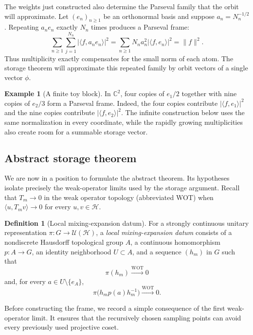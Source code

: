 \documentclass[reqno]{amsart}
\numberwithin{equation}{section}
\theoremstyle{definition}
\newtheorem{definition}[theorem]{Definition}
\newtheorem{example}[theorem]{Example}
\theoremstyle{remark}
\newcommand{\cH}{\mathcal H}
\newcommand{\U}{\mathcal U}
\begin{document}
The weights just constructed also determine the Parseval family that the
orbit will approximate.  Let $(e_n)_{n\geq1}$ be an orthonormal basis and suppose
$a_n=N_n^{-1/2}$.  Repeating $a_ne_n$ exactly $N_n$ times produces a
Parseval frame:
\begin{equation}\label{eq:model-parseval-calculation}
 \sum_{n\geq1}\sum_{j=1}^{N_n}
 |\langle f,a_ne_n\rangle|^2
 =\sum_{n\geq1}N_na_n^2|\langle f,e_n\rangle|^2
 =\|f\|^2.
\end{equation}
Thus multiplicity exactly compensates for the small norm of each atom.  The
storage theorem will approximate this repeated family by orbit vectors of a
single vector $\phi$.

\begin{example}[A finite toy block]\label{ex:finite-parseval-block}
In $\mathbb C^2$, four copies of $e_1/2$ together with nine copies of
$e_2/3$ form a Parseval frame.  Indeed, the four copies contribute
$|\langle f,e_1\rangle|^2$ and the nine copies contribute
$|\langle f,e_2\rangle|^2$.  The infinite construction below uses the same
normalization in every coordinate, while the rapidly growing multiplicities
also create room for a summable storage vector.
\end{example}

\subsection{Abstract storage theorem}

We are now in a position to formulate the abstract theorem.  Its hypotheses
isolate precisely the weak-operator limits used by the storage argument.
Recall that $T_m\to0$ in the weak operator topology
(abbreviated WOT) when $\langle u,T_mv\rangle\to0$ for every $u,v\in\cH$.

\begin{definition}[Local mixing-expansion datum]
\label{def:mixing-expansion}
For a strongly continuous unitary representation $\pi:G\to\U(\cH)$, a
\emph{local mixing-expansion datum} consists of a nondiscrete Hausdorff
topological group $A$, a continuous homomorphism $p:A\to G$, an identity
neighborhood $U\subset A$, and a sequence $(h_m)$ in $G$ such that
\[
 \pi(h_m)\xrightarrow{\mathrm{WOT}}0
\]
and, for every $a\in U\setminus\{e_A\}$,
\[
 \pi\bigl(h_mp(a)h_m^{-1}\bigr)\xrightarrow{\mathrm{WOT}}0.
\]
\end{definition}

Before constructing the frame, we record a simple consequence of the first
weak-operator limit.  It ensures that the recursively chosen sampling points
can avoid every previously used projective coset.
\end{document}
